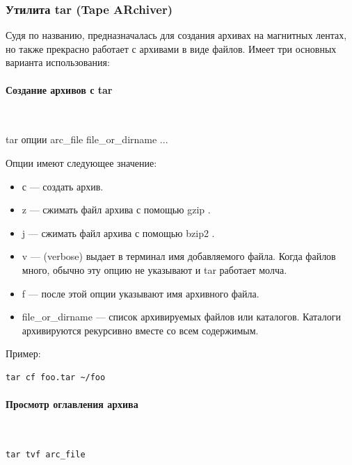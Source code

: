 \documentclass[14pt, a4paper]{article}
\begin{document}
\subsubsection*{Утилита tar (Tape ARchiver)}

Судя по названию, предназначалась для создания архивах на магнитных лентах, но также
прекрасно работает с архивами в виде файлов. Имеет три основных варианта использования:

\paragraph*{Создание архивов с tar} \mbox{}\\

\colorbox{backcolour}{tar опции arc\_file file\_or\_dirname ...}

Опции имеют следующее значение:
\begin{itemize}
    \item с — создать архив.
    \item z — сжимать файл архива с помощью gzip .
    \item j — сжимать файл архива с помощью bzip2 .
    \item v — (verbose) выдает в терминал имя добавляемого файла. Когда файлов много, обычно
    эту опцию не указывают и tar работает молча.
    \item f — после этой опции указывают имя архивного файла.
    \item file\_or\_dirname — список архивируемых файлов или каталогов. Каталоги архивируются
    рекурсивно вместе со всем содержимым.
\end{itemize}

Пример:

\begin{lstlisting}
tar cf foo.tar ~/foo
\end{lstlisting}

\paragraph*{Просмотр оглавления архива} \mbox{}\\

\begin{lstlisting}
tar tvf arc_file
\end{lstlisting}
\end{document}
